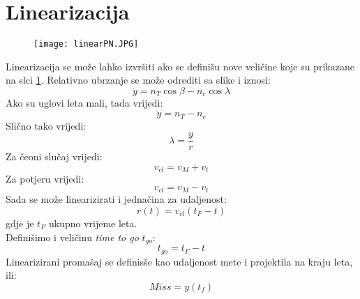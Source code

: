 \section{Linearizacija}
\begin{figure}
    \centering
    \texttt{[image: linearPN.JPG]}
    \label{fig:linear}
\end{figure}

Linearizacija se može lahko izvršiti ako se definišu nove veličine koje su prikazane na slci \ref{fig:linear}.
Relativno ubrzanje se može odrediti sa slike i iznosi:
\begin{equation}
    \ddot{y}=n_T\cos\beta-n_c\cos\lambda
\end{equation}
Ako su uglovi leta mali, tada vrijedi:
\begin{equation}
    \ddot{y}=n_T-n_c
\end{equation}
Slično tako vrijedi:
\begin{equation}
    \lambda = \frac{y}{r}
\end{equation}
Za čeoni slučaj vrijedi:
\begin{equation}
    v_{cl}=v_M+v_t
\end{equation}
Za potjeru vrijedi:
\begin{equation}
    v_{cl}=v_M-v_t
\end{equation}
Sada se može linearizirati i jednačina za udaljenost:
\begin{equation}
    r(t)=v_{cl}(t_F-t)
\end{equation}
gdje je $t_F$ ukupno vrijeme leta.\\
Definišimo i veličinu \textit{time to go} $t_{go}$:
\begin{equation}
    t_{go}=t_F-t
\end{equation}
Linearizirani promašaj se definisše kao udaljenost mete i projektila na kraju leta, ili:
\begin{equation}
    Miss=y(t_f)
\end{equation}

